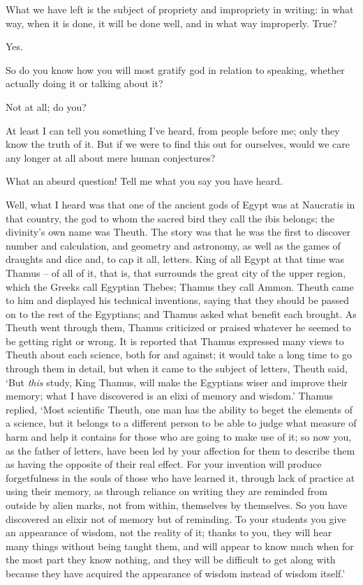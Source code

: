 What we have left is the subject of propriety and impropriety
in writing: in what way,
when it is done, it will be done well, and in what way improperly. True?

Yes.

So do you know how you will most gratify god in relation to
speaking, whether actually doing it or talking about  it?

Not at all; do you?

At least I can tell you something I've heard, from 
people before me; only they know the truth of it. But if we were to find
this out for ourselves, would we care any longer at all about mere human
conjectures?

What an absurd question! Tell me what you say you have heard.

Well, what I heard was that one of the ancient gods  of
Egypt was at Naucratis in that country, the god to whom the sacred bird
they call the ibis belongs; the divinity's own name was Theuth. The
story was that he was the first to discover number and calculation, and
geometry and astronomy, as well  as the games of draughts and
dice and, to cap it all, letters. King of all Egypt at that time was
Thamus -- of all of it, that is, that surrounds the great city of the
upper region, which the  Greeks call Egyptian Thebes; Thamus
they call Ammon. Theuth came to him and displayed his technical
inventions, saying that they should be passed on to the rest of the
Egyptians; and Thamus asked what benefit each brought. As Theuth went
 through them, Thamus criticized or praised whatever he seemed
to be getting right or wrong. It is reported that Thamus expressed many
views to Theuth about each science, both for and against; it would take
a long time to go through them in detail, but when it came to the
subject of letters, Theuth said,  ‘But {\em this} study, King
Thamus, will make the Egyptians wiser and improve their memory; what I
have discovered is an
elixi of memory and
wisdom.' Thamus replied, ‘Most scientific Theuth, one man has the
ability to beget the elements of a science, but it belongs to a
different person to be able to judge what measure of harm and help it
contains for those who are  going to make use of it; so now
you, as the father of letters, have been led by your affection for them
to describe them as having the opposite of their real effect. For your
invention will produce forgetfulness in the souls of those who have
learned it, through lack of practice at using their memory, as through
reliance on writing they are reminded from outside by alien 
marks, not from within, themselves by
themselves. So you have
discovered an elixir not of memory but of reminding. To your students
you give an appearance of wisdom, not the reality of it; thanks to you,
they will hear many things without being  taught them, and will
appear to know much when for the most part they know nothing, and they
will be difficult to get along with because they have acquired the
appearance of wisdom instead of wisdom itself.'

